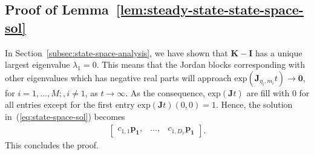 \subsection{Proof of Lemma~\ref{lem:steady-state-state-space-sol}}
\label{secapp:steady-state-state-space-sol}
In Section~\ref{subsec:state-space-analysis}, we have shown that $\bm{K} - \bm{I}$ has a unique largest eigenvalue $\lambda_1 = 0$. This means that the Jordan blocks corresponding with other eigenvalues which has negative real parts will approach $\mathrm{exp}(\bm{J}_{\eta_i, m_i}t) \rightarrow \bm{0}$, for $i = 1, \dots, M;, i \neq 1$, as $t \rightarrow \infty$. As the consequence, $\mathrm{exp}(\bm{J}t)$ are fill with 0 for all entries except for the first entry $\mathrm{exp}(\bm{J}t)(0, 0) = 1$. Hence, the solution in~(\ref{eq:state-space-sol}) becomes 
\begin{align}
\nonumber
    \begin{bmatrix} \displaystyle c_{1,1}\bm{p_1}, & \dots ,& \displaystyle c_{1, D_x}\bm{p_1} \end{bmatrix}.
\end{align}
This concludes the proof.
